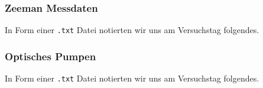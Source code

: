 \documentclass[../main.tex]{subfiles}
\begin{document}
    \subsubsection*{Zeeman Messdaten}
        In Form einer \texttt{.txt} Datei notierten wir uns am Versuchstag folgendes.
        

    \subsubsection*{Optisches Pumpen}
        In Form einer \texttt{.txt} Datei notierten wir uns am Versuchstag folgendes.
        
\end{document}
